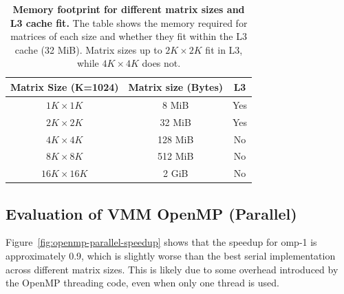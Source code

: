 \begin{table}[htbp]
    \centering
    \begin{tabular}{c|c|c}
        \textbf{Matrix Size (K=1024)} & \textbf{Matrix size (Bytes)} & \textbf{L3} \\
        \hline
        \(1K \times 1K\) & 8 MiB& Yes\\
        \(2K \times 2K\)  & 32 MiB& Yes\\
        \(4K \times 4K\)  & 128 MiB& No \\
        \(8K \times 8K\)  & 512 MiB& No \\
        \(16K \times 16K\)  & 2 GiB& No \\
    \end{tabular}
    \caption{\textbf{Memory footprint for different matrix sizes and L3 cache fit.} The table shows the memory required for matrices of each size and whether they fit within the L3 cache (32 MiB). Matrix sizes up to \(2K \times 2K\) fit in L3, while \(4K \times 4K\) does not.}
    \label{tab:memory-footprint-matrices}
\end{table}

\subsection{Evaluation of VMM OpenMP (Parallel)}
\label{subsec:evaluation-openmp-parallel}

Figure~\ref{fig:openmp-parallel-speedup} shows that the speedup for omp-1 is approximately 0.9, which is slightly worse than the best serial implementation across different matrix sizes. This is likely due to some overhead introduced by the OpenMP threading code, even when only one thread is used.

